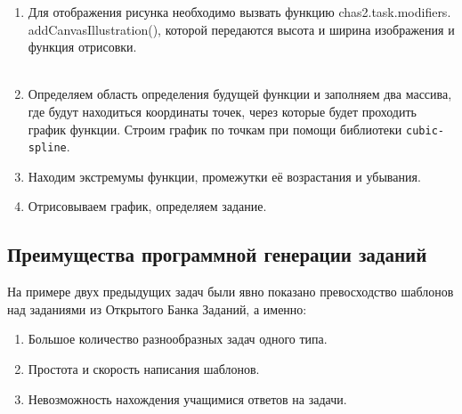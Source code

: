 \begin{enumerate}
	\item Для отображения рисунка необходимо вызвать функцию chas2.task.modifiers.
	      addCanvasIllustration(), которой передаются высота и ширина изображения и функция отрисовки.\\
	      \\
	      
	\item Определяем область определения будущей функции и заполняем два массива, где будут находиться координаты точек, через которые будет проходить график функции.
	      Строим график по точкам при помощи библиотеки \texttt{cubic-spline}.
	      
	\item Находим экстремумы функции, промежутки её возрастания и убывания.
	      
	\item Отрисовываем график, определяем задание.
	      

\end{enumerate}

\subsection{Преимущества программной генерации заданий}
На примере двух предыдущих задач были явно показано превосходство шаблонов над заданиями из Открытого Банка Заданий, а именно:
\begin{enumerate}
	\item Большое количество разнообразных задач одного типа.
	\item Простота и скорость написания шаблонов.
	\item Невозможность нахождения учащимися ответов на задачи.
\end{enumerate}

